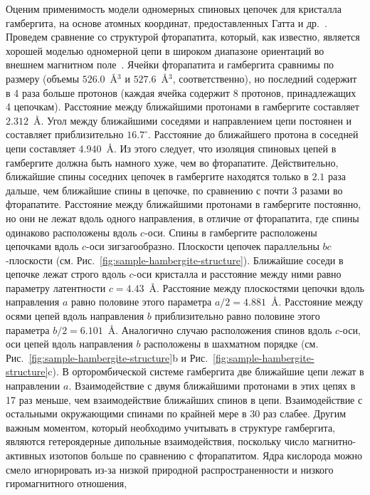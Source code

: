 Оценим применимость модели одномерных спиновых цепочек для кристалла гамбергита,
на основе атомных координат, предоставленных Гатта и др.~\cite{Gatta2012}.
Проведем сравнение со структурой фторапатита,
который, как известно,
является хорошей моделью одномерной цепи в широком диапазоне ориентаций во внешнем магнитном поле~\cite{Bochkin2019}.
Ячейки фторапатита и гамбергита сравнимы по размеру (объемы $526.0$~\r{A}$^3$ и $527.6$~\r{A}$^3$, соответственно),
но последний содержит в 4 раза больше протонов
(каждая ячейка содержит 8 протонов, принадлежащих 4 цепочкам).
Расстояние между ближайшими протонами в гамбергите составляет $2.312$~\r{A}.
Угол между ближайшими соседями и направлением цепи постоянен и составляет приблизительно $16.7^\circ$.
Расстояние до ближайшего протона в соседней цепи составляет $4.940$~\r{A}.
Из этого следует, что изоляция спиновых цепей в гамбергите должна быть намного хуже, чем во фторапатите.
Действительно, ближайшие спины соседних цепочек в гамбергите находятся только в $2.1$ раза дальше,
чем ближайшие спины в цепочке,
по сравнению с почти 3 разами во фторапатите.
Расстояние между ближайшими протонами в гамбергите постоянно,
но они не лежат вдоль одного направления,
в отличие от фторапатита,
где спины одинаково расположены вдоль $c$-оси.
Спины в гамбергите расположены цепочками вдоль $c$-оси зигзагообразно.
Плоскости цепочек параллельны $bc$-плоскости  (см. Рис.~\ref{fig:sample-hambergite-structure}).
Ближайшие соседи в цепочке лежат строго вдоль $c$-оси кристалла
и расстояние между ними равно параметру латентности $c = 4.43$~\r{A}.
Расстояние между плоскостями цепочки вдоль направления $a$ равно половине этого параметра $a/2 = 4.881$~\r{A}.
Расстояние между осями цепей вдоль направления $b$ приблизительно равно половине этого параметра $b/2 = 6.101$~\r{A}.
Аналогично случаю расположения спинов вдоль $c$-оси,
оси цепей вдоль направления $b$ расположены в шахматном порядке (см. Рис.~\ref{fig:sample-hambergite-structure}b и Рис.~\ref{fig:sample-hambergite-structure}c).
В орторомбической системе гамбергита две ближайшие цепи лежат в направлении $a$.
Взаимодействие с двумя ближайшими протонами в этих цепях в 17 раз меньше,
чем взаимодействие ближайших спинов в цепи.
Взаимодействие с остальными окружающими спинами по крайней мере в 30 раз слабее.
Другим важным моментом, который необходимо учитывать в структуре гамбергита,
являются гетероядерные дипольные взаимодействия,
поскольку число магнитно-активных изотопов больше по сравнению с фторапатитом.
Ядра кислорода можно смело игнорировать из-за низкой природной распространенности и низкого гиромагнитного отношения,
